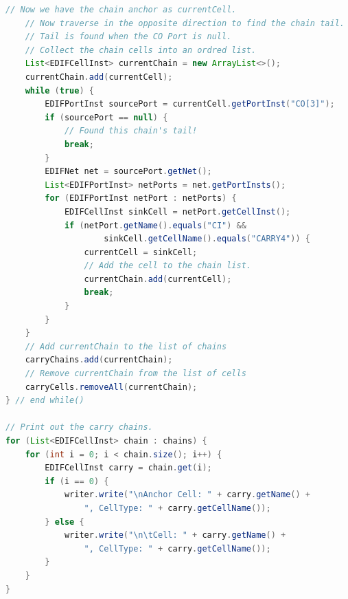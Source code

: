 \begin{multicols}{2}
\begin{lstlisting}[language=java, caption={Finding and storing carry chains.}, label={lst:carry_chains}]
    // Now we have the chain anchor as currentCell.
    // Now traverse in the opposite direction to find the chain tail.
    // Tail is found when the CO Port is null.
    // Collect the chain cells into an ordred list.
    List<EDIFCellInst> currentChain = new ArrayList<>();
    currentChain.add(currentCell);
    while (true) {
        EDIFPortInst sourcePort = currentCell.getPortInst("CO[3]");
        if (sourcePort == null) {
            // Found this chain's tail!
            break;
        }
        EDIFNet net = sourcePort.getNet();
        List<EDIFPortInst> netPorts = net.getPortInsts();
        for (EDIFPortInst netPort : netPorts) {
            EDIFCellInst sinkCell = netPort.getCellInst();
            if (netPort.getName().equals("CI") &&
                    sinkCell.getCellName().equals("CARRY4")) {
                currentCell = sinkCell;
                // Add the cell to the chain list.
                currentChain.add(currentCell);
                break;
            }
        }
    }
    // Add currentChain to the list of chains
    carryChains.add(currentChain);
    // Remove currentChain from the list of cells
    carryCells.removeAll(currentChain);
} // end while()

// Print out the carry chains. 
for (List<EDIFCellInst> chain : chains) {
    for (int i = 0; i < chain.size(); i++) {
        EDIFCellInst carry = chain.get(i);
        if (i == 0) {
            writer.write("\nAnchor Cell: " + carry.getName() + 
                ", CellType: " + carry.getCellName());
        } else {
            writer.write("\n\tCell: " + carry.getName() + 
                ", CellType: " + carry.getCellName());
        }
    }
}
\end{lstlisting}
\newpage





\end{multicols}
